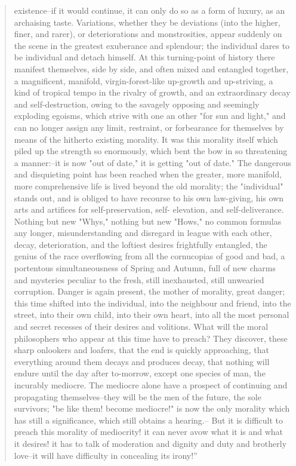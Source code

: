 \begin{quotation}
existence--if it would continue, it can only do so as a form of luxury, as an archaising taste.
Variations, whether they be deviations (into the higher, finer, and rarer), or deteriorations and
monstrosities, appear suddenly on the scene in the greatest exuberance and splendour; the
individual dares to be individual and detach himself. At this turning-point of history there
manifest themselves, side by side, and often mixed and entangled together, a magnificent,
manifold, virgin-forest-like up-growth and up-striving, a kind of tropical tempo in the rivalry of
growth, and an extraordinary decay and self-destruction, owing to the savagely opposing and
seemingly exploding egoisms, which strive with one an other "for sun and light," and can no
longer assign any limit, restraint, or forbearance for themselves by means of the hitherto existing
morality. It was this morality itself which piled up the strength so enormously, which bent the
bow in so threatening a manner:--it is now "out of date," it is getting "out of date." The
dangerous and disquieting point has been reached when the greater, more manifold, more
comprehensive life is lived beyond the old morality; the "individual" stands out, and is obliged to
have recourse to his own law-giving, his own arts and artifices for self-preservation, self-
elevation, and self-deliverance. Nothing but new "Whys," nothing but new "Hows," no common
formulas any longer, misunderstanding and disregard in league with each other, decay,
deterioration, and the loftiest desires frightfully entangled, the genius of the race overflowing
from all the cornucopias of good and bad, a portentous simultaneousness of Spring and Autumn,
full of new charms and mysteries peculiar to the fresh, still inexhausted, still unwearied
corruption. Danger is again present, the mother of morality, great danger; this time shifted into
the individual, into the neighbour and friend, into the street, into their own child, into their own
heart, into all the most personal and secret recesses of their desires and volitions. What will the
moral philosophers who appear at this time have to preach? They discover, these sharp onlookers
and loafers, that the end is quickly approaching, that everything around them decays and
produces decay, that nothing will endure until the day after to-morrow, except one species of
man, the incurably mediocre. The mediocre alone have a prospect of continuing and propagating
themselves--they will be the men of the future, the sole survivors; "be like them! become
mediocre!" is now the only morality which has still a significance, which still obtains a hearing.--
But it is difficult to preach this morality of mediocrity! it can never avow what it is and what it
desires! it has to talk of moderation and dignity and duty and brotherly love--it will have
difficulty in concealing its irony!''
\end{quotation}

